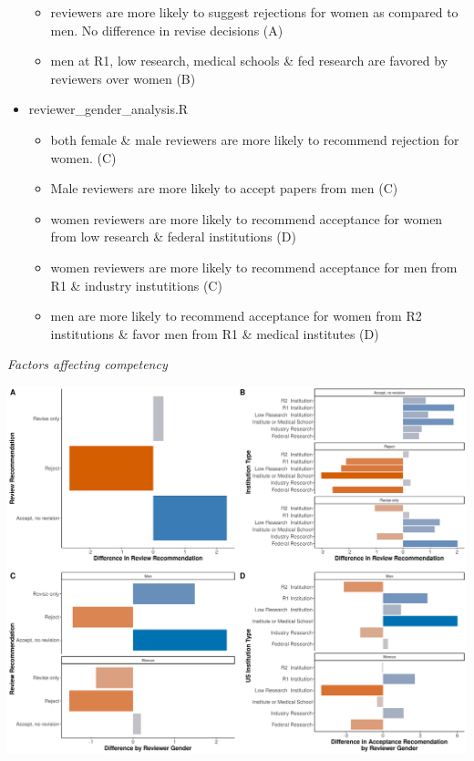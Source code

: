 \documentclass[11pt,]{article}
\providecommand{\tightlist}{%
  \setlength{\itemsep}{0pt}\setlength{\parskip}{0pt}}
\begin{document}
\begin{itemize}
  \begin{itemize}
  \tightlist
  \item
    reviewers are more likely to suggest rejections for women as
    compared to men. No difference in revise decisions (A)
  \item
    men at R1, low research, medical schools \& fed research are favored
    by reviewers over women (B)
  \end{itemize}
\item
  reviewer\_gender\_analysis.R

  \begin{itemize}
  \tightlist
  \item
    both female \& male reviewers are more likely to recommend rejection
    for women. (C)
  \item
    Male reviewers are more likely to accept papers from men (C)
  \item
    women reviewers are more likely to recommend acceptance for women
    from low research \& federal institutions (D)
  \item
    women reviewers are more likely to recommend acceptance for men from
    R1 \& industry instutitions (C)
  \item
    men are more likely to recommend acceptance for women from R2
    institutions \& favor men from R1 \& medical institutes (D)
  \end{itemize}
\end{itemize}

\emph{Factors affecting competency}

\includegraphics{Figure_8.png}
\end{document}
